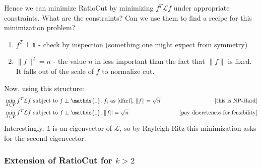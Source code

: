 \documentclass{article}
\newcommand{\an}[1]{{\leavevmode\color{red}{#1}}}
\begin{document}
Hence we can minimize RatioCut by minimizing $f^T \mathcal{L} f$ under appropriate constraints. What are the constraints? Can we use them to find a recipe for this minimization problem?
\begin{enumerate}
    \item $f^T \perp \mathds{1}$ - check by inspection (something one might expect from symmetry)
    \item $\|f\|^2 = n$ - the value $n$ in less important than the fact that $\|f\|$ is fixed. It falls out of the scale of $f$ to normalize cut. 
\end{enumerate}
Now, using this structure:
\begin{align}
   &\min_{A \subset V} f^T \mathcal{L} f \text{ subject to $f \perp \mathds{1}$, $f_i$ as \eqref{dfn:f}, $\|f\|=\sqrt{n}$ }  \qquad &\text{[this is NP-Hard]} \\
   &\min_{A \subset V} f^T \mathcal{L} f \text{ subject to $f \perp \mathds{1}$, $\|f\|=\sqrt{n}$ }  \qquad &\text{[pay discreteness for feasibility]} 
\end{align}
Interestingly, $\mathds{1}$ is an eigenvector of $\mathcal{L}$, so by Rayleigh-Ritz this minimization asks for the second eigenvector.\an{Maybe you should tell us what ``Rayleigh-Ritz'' is.}
\subsubsection*{Extension of RatioCut for $k>2$}
\end{document}
